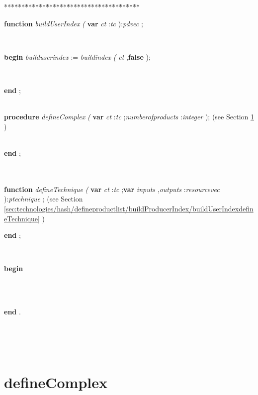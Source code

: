 \begin{tabbing}
***\=***\=***\=***\=***\=***\=***\=***\=***\=***\=***\=***\=***\=\kill
\parbox{14cm}{\textsf{\textbf{function}   \textit{buildUserIndex} \textit{(} \textbf{var}  \textit{ct} :\textit{tc} ):\textit{pdvec}  ;}}\\
\+\parbox{14cm}{\textsf{\textbf{begin}  \textit{builduserindex} := \textit{buildindex} \textit{(} \textit{ct} ,\textbf{false} );}}\\
\<\-\parbox{14cm}{\textsf{\textbf{end} ;}}\\
\+\textsf{\textbf{procedure}   \textit{defineComplex} \textit{(} \textbf{var}  \textit{ct} :\textit{tc} ;\textit{numberofproducts} :\textit{integer} );} (see Section \ref{sec:technologies/hash/defineproductlist/buildProducerIndex/buildUserIndexdefineComplex} )\\
\\
\<\-\parbox{14cm}{\textsf{\textbf{end} ;}}\\
\\
\textsf{\textbf{function}   \textit{defineTechnique} \textit{(} \textbf{var}  \textit{ct} :\textit{tc} ;\textbf{var}  \textit{inputs} ,\textit{outputs} :\textit{resourcevec}  ):\textit{ptechnique} ;} (see Section \ref{sec:technologies/hash/defineproductlist/buildProducerIndex/buildUserIndexdefineTechnique} )\\
\parbox{14cm}{\textsf{\textbf{end} ;}}\\
\parbox{14cm}{\textsf{\textbf{begin} }}\\
\\
\parbox{14cm}{\textsf{\textbf{end} .}}\\
\\
\\
\end{tabbing}
\section{defineComplex}\label{sec:technologies/hash/defineproductlist/buildProducerIndex/buildUserIndexdefineComplex}


